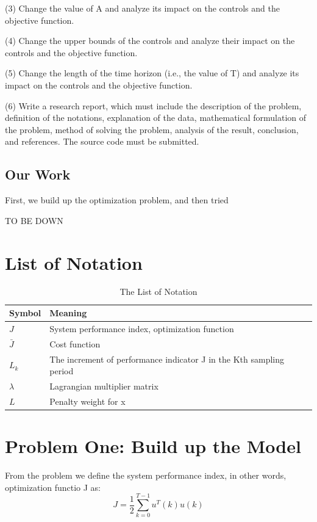 \documentclass{mcmthesis}
\begin{document}
(3)	Change the value of A and analyze its impact on the controls and the objective function.

(4)	Change the upper bounds of the controls and analyze their impact on the controls and the objective function.

(5)	Change the length of the time horizon (i.e., the value of T) and analyze its impact on the controls and the objective function.

(6)	Write a research report, which must include the description of the problem, definition of the notations, explanation of the data, mathematical formulation of the problem, method of solving the problem, analysis of the result, conclusion, and references. The source code must be submitted.


\subsection{Our Work}
First, we build up the optimization problem, and then tried

TO BE DOWN

\section{List of Notation}

\begin{center}
\begin{longtable}{p{}p{}m{}}
\caption{The List of Notation}\\
\hline
Symbol& Meaning \\
\hline

$J$      & System performance index, optimization function
                                                         \\
$\bar J$ & Cost function    \\
$L_k$      & The increment of performance indicator J in the Kth sampling period
                                                          \\
$\lambda$     & Lagrangian multiplier matrix\\
$L$     & Penalty weight for x
                                                                                        \\ \hline

 \end{longtable}
 \end{center}


\section{Problem One: Build up the Model}
From the problem we define the system performance index, in other words, optimization functio J as:
$$J=\frac{1}{2}\sum^{T-1}_{k=0}u^T(k)u(k)$$
\end{document}
